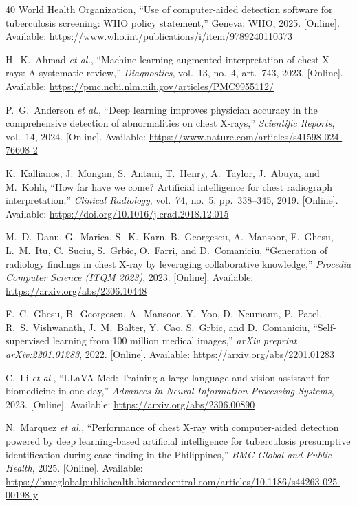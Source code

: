 \documentclass[conference, letterpaper]{IEEEtran}
\begin{document}
\begin{thebibliography}{40}
World Health Organization, ``Use of computer-aided detection software for tuberculosis screening: WHO policy statement,'' Geneva: WHO, 2025. [Online]. Available: \url{https://www.who.int/publications/i/item/9789240110373}

H.~K.~Ahmad \textit{et al.}, ``Machine learning augmented interpretation of chest X-rays: A systematic review,'' \textit{Diagnostics}, vol.~13, no.~4, art.~743, 2023. [Online]. Available: \url{https://pmc.ncbi.nlm.nih.gov/articles/PMC9955112/}

P.~G.~Anderson \textit{et al.}, ``Deep learning improves physician accuracy in the comprehensive detection of abnormalities on chest X-rays,'' \textit{Scientific Reports}, vol.~14, 2024. [Online]. Available: \url{https://www.nature.com/articles/s41598-024-76608-2}

K.~Kallianos, J.~Mongan, S.~Antani, T.~Henry, A.~Taylor, J.~Abuya, and M.~Kohli, ``How far have we come? Artificial intelligence for chest radiograph interpretation,'' \textit{Clinical Radiology}, vol.~74, no.~5, pp.~338--345, 2019. [Online]. Available: \url{https://doi.org/10.1016/j.crad.2018.12.015}

M.~D.~Danu, G.~Marica, S.~K.~Karn, B.~Georgescu, A.~Mansoor, F.~Ghesu, L.~M.~Itu, C.~Suciu, S.~Grbic, O.~Farri, and D.~Comaniciu, ``Generation of radiology findings in chest X-ray by leveraging collaborative knowledge,'' \textit{Procedia Computer Science (ITQM 2023)}, 2023. [Online]. Available: \url{https://arxiv.org/abs/2306.10448}

F.~C.~Ghesu, B.~Georgescu, A.~Mansoor, Y.~Yoo, D.~Neumann, P.~Patel, R.~S.~Vishwanath, J.~M.~Balter, Y.~Cao, S.~Grbic, and D.~Comaniciu, ``Self-supervised learning from 100 million medical images,'' \textit{arXiv preprint arXiv:2201.01283}, 2022. [Online]. Available: \url{https://arxiv.org/abs/2201.01283}

C.~Li \textit{et al.}, ``LLaVA-Med: Training a large language-and-vision assistant for biomedicine in one day,'' \textit{Advances in Neural Information Processing Systems}, 2023. [Online]. Available: \url{https://arxiv.org/abs/2306.00890}

N.~Marquez \textit{et al.}, ``Performance of chest X-ray with computer-aided detection powered by deep learning-based artificial intelligence for tuberculosis presumptive identification during case finding in the Philippines,'' \textit{BMC Global and Public Health}, 2025. [Online]. Available: \url{https://bmcglobalpublichealth.biomedcentral.com/articles/10.1186/s44263-025-00198-y}


\end{thebibliography}
\end{document}
